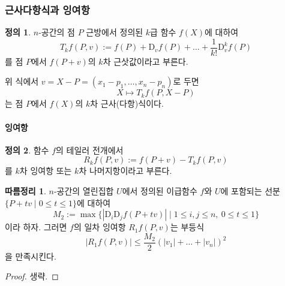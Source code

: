 \documentclass[unfonts,oneside,a4paper]{oblivoir}
\theoremstyle{definition}
\newtheorem{definition}{정의}[subsubsection]
\theoremstyle{theorem}
\newtheorem{corollary}{따름정리}[subsubsection]
\renewcommand{\vec}[1]{\bm{\mathit{#1}}}
\newcommand{\dD}{\mathrm{D}}
\begin{document}
\subsubsection{근사다항식과 잉여항}

\begin{definition}
    $n$-공간의 점 $P$ 근방에서 정의된 $k$급 함수 $f(X)$에 대하여
    \begin{equation*}
        T_k f(P, \vec v) := f(P) + \dD_{\vec v}f(P) + \dots + \frac{1}{k!} \dD_{\vec v}^k f(P)
    \end{equation*}
    를 점 $P$에서 $f(P + \vec v)$의 $k$차 근삿값이라고 부른다.
\end{definition}

위 식에서 $\vec v = X - P = (x_1 - p_1, \dots, x_n - p_n)$로 두면
\begin{equation*}
    X \mapsto T_k f(P, X - P)
\end{equation*}
는 점 $P$에서 $f(X)$의 $k$차 근사(다항)식이다.

\paragraph{잉여항}
\begin{definition}
    함수 $f$의 테일러 전개에서
    \begin{equation*}
        R_k f(P, \vec v) := f(P + \vec v) - T_k f(P, \vec v)
    \end{equation*}
    를 $k$차 잉여항 또는 $k$차 나머지항이라고 부른다.
\end{definition}

\begin{corollary} \label{cor:residue}
    $n$-공간의 열린집합 $U$에서 정의된 이급함수 $f$와 $U$에 포함되는 선분 $\{P + t \vec v \mid 0 \leq t \leq 1\}$에 대하여
    \begin{equation*}
        M_2 := \max \{|\dD_i \dD_j f(P + t \vec v)| \mid 1 \leq i, j \leq n,\ 0 \leq t \leq 1\}
    \end{equation*}
    이라 하자.
    그러면 $f$의 일차 잉여항 $R_1 f(P, \vec v)$는 부등식
    \begin{equation*}
        |R_1 f(P, \vec v)| \leq \frac{M_2}{2} (|v_1| + \dots + |v_n|)^2
    \end{equation*}
    을 만족시킨다.
\end{corollary}

\begin{proof}
    생략.
\end{proof}
\end{document}
